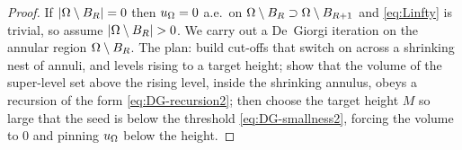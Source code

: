 \begin{proof}
If $\left|\Omega\setminus B_R\right|=0$ then $u_\Omega=0$ a.e.\ on
$\Omega\setminus B_R\supset\Omega\setminus B_{R+1}$ and \eqref{eq:Linfty} is
trivial, so assume $\abs{\Om\setminus B_R}>0$.
We carry out a De~Giorgi iteration on the annular region
$\Omega\setminus B_R$. The plan: build cut-offs that switch on across a
shrinking nest of annuli, and levels rising to a target height; show
that the volume of the super-level set above the rising level, inside the
shrinking annulus, obeys a recursion of the form
\eqref{eq:DG-recursion2}; then choose the target height $M$ so large that
the seed is below the threshold \eqref{eq:DG-smallness2}, forcing the
volume to $0$ and pinning $u_\Omega$ below the height.


\end{proof}
